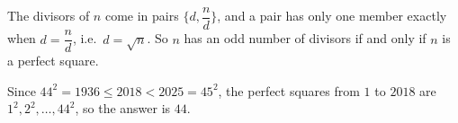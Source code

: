 The divisors of $n$ come in pairs $\{d,\dfrac {n}{d}\}$, and a pair has only one member exactly when $d=\dfrac {n}{d}$, i.e.\ $d=\sqrt n$. So $n$ has an odd number of divisors if and only if $n$ is a perfect square.

Since $44^2=1936\le2018<2025=45^2$, the perfect squares from $1$ to $2018$ are $1^2,2^2,\dots,44^2$, so the answer is $\boxed{44}$.
